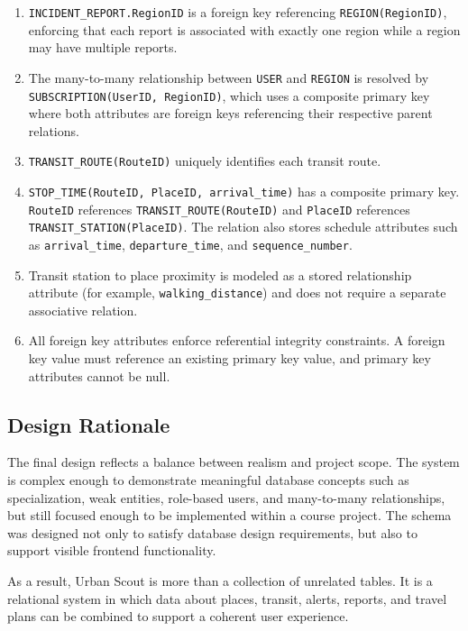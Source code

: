 \begin{enumerate}
    \item \texttt{INCIDENT\_REPORT.RegionID} is a foreign key referencing \texttt{REGION(RegionID)}, enforcing that each report is associated with exactly one region while a region may have multiple reports.
    \item The many-to-many relationship between \texttt{USER} and \texttt{REGION} is resolved by \texttt{SUBSCRIPTION(UserID, RegionID)}, which uses a composite primary key where both attributes are foreign keys referencing their respective parent relations.
    \item \texttt{TRANSIT\_ROUTE(RouteID)} uniquely identifies each transit route.
    \item \texttt{STOP\_TIME(RouteID, PlaceID, arrival\_time)} has a composite primary key. \texttt{RouteID} references \texttt{TRANSIT\_ROUTE(RouteID)} and \texttt{PlaceID} references \texttt{TRANSIT\_STATION(PlaceID)}. The relation also stores schedule attributes such as \texttt{arrival\_time}, \texttt{departure\_time}, and \texttt{sequence\_number}.
    \item Transit station to place proximity is modeled as a stored relationship attribute (for example, \texttt{walking\_distance}) and does not require a separate associative relation.
    \item All foreign key attributes enforce referential integrity constraints. A foreign key value must reference an existing primary key value, and primary key attributes cannot be null.
\end{enumerate}

\subsection{Design Rationale}

The final design reflects a balance between realism and project scope. The system is complex enough to demonstrate meaningful database concepts such as specialization, weak entities, role-based users, and many-to-many relationships, but still focused enough to be implemented within a course project. The schema was designed not only to satisfy database design requirements, but also to support visible frontend functionality.

As a result, Urban Scout is more than a collection of unrelated tables. It is a relational system in which data about places, transit, alerts, reports, and travel plans can be combined to support a coherent user experience.
